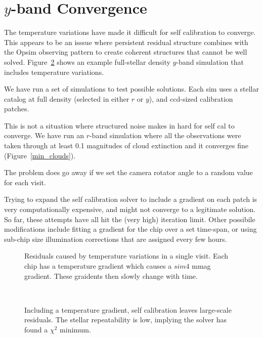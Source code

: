 \section{$y$-band Convergence}
The temperature variations have made it difficult for self calibration to converge.  This appears to be an isssue where persistent residual structure combines with the Opsim observing pattern to create coherent structures that cannot be well solved.  Figure~\ref{y_chip} shows an example full-stellar density $y$-band simulation that includes temperature variations.  

We have run a set of simulations to test possible solutions.  Each sim uses a stellar catalog at full density (selected in either $r$ or $y$), and ccd-sized calibration patches.  

This is not a situation where structured noise makes in hard for self cal to converge.  We have run an $r$-band simulation where all the observations were taken through at least 0.1 magnitudes of cloud extinction and it converges fine (Figure~\ref{min_clouds}).  

The problem does go away if we set the camera rotator angle to a random value for each visit.  

Trying to expand the self calibration solver to include a gradient on each patch is very computationally expensive, and might not converge to a legitimate solution.  So far, these attempts have all hit the (very high) iteration limit.  Other possibile modifications include fitting a gradient for the chip over a set time-span, or using sub-chip size illumination corrections that are assigned every few hours.  


\begin{figure}
\caption{Residuals caused by temperature variations in a single visit.  Each chip has a temperature gradient which causes a $sim4$ mmag gradient.  These graidents then slowly change with time.  \label{dmag_temperature}}
\end{figure}

\begin{figure}
\\
\caption{Including a temperature gradient, self calibration leaves large-scale residuals.  The stellar repeatability is low, implying the solver has found a $\chi^2$ minimum. \label{y_chip}}
\end{figure}

